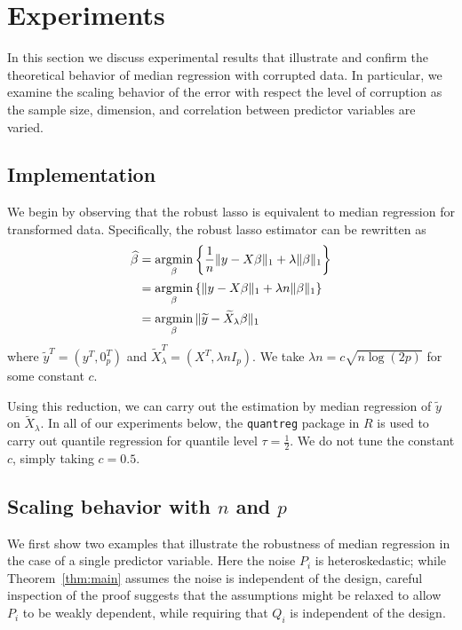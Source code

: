 
\section{Experiments}
\label{sec:experiments}

In this section we discuss experimental results that illustrate and confirm the theoretical behavior of
median regression with corrupted data. In particular, we examine the scaling behavior of the error
with respect the level of corruption as the sample size, dimension, and correlation between predictor variables
are varied.

\subsection{Implementation}

We begin by observing that the robust lasso is equivalent to median regression for transformed data. Specifically, the robust lasso estimator can be rewritten as
\begin{align*}
  \hat\beta &= \argmin_\beta \left\{ \frac{1}{n}\|y - X\beta\|_1 + \lambda \|\beta\|_1 \right\} \\
  &= \argmin_\beta \left\{ \|y - X\beta\|_1 + \lambda n \|\beta\|_1 \right\} \\
  &= \argmin_\beta \|\tilde y - \tilde X_\lambda \beta\|_1
\end{align*}
where $\tilde y^T = (y^T, 0_p^T)$  and $\tilde X_\lambda^T = (X^T, \lambda n I_p)$.
We take $\lambda n = c\sqrt{n \log (2p)}$ for some constant $c$.

Using this reduction, we can carry out the estimation by
median regression of $\tilde y$ on $\tilde X_\lambda$. In all of our experiments below, the \texttt{quantreg} package in $R$ is used to carry out quantile regression for quantile level $\tau = \frac{1}{2}$. We do not tune the constant $c$, simply taking $c=0.5$.



\subsection{Scaling behavior with $n$ and $p$}


We first show two examples that illustrate the robustness of median regression
in the case of a single predictor variable. Here the noise $P_i$ is heteroskedastic; while Theorem~\ref{thm:main} assumes the noise is independent of the design, careful inspection of the proof suggests that the assumptions might be relaxed to allow $P_i$ to be weakly dependent, while requiring that $Q_i$ is independent of the design. 

